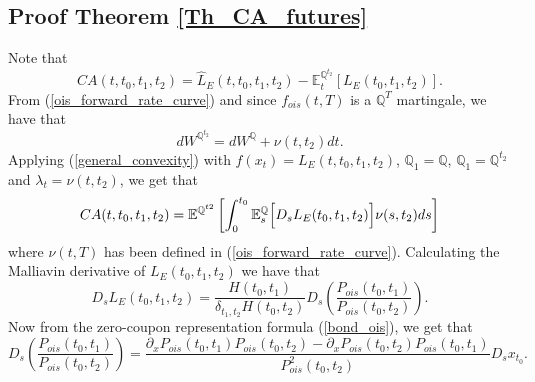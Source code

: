\documentclass[a4paper,10pt]{article}
\newcommand{\1}{\mathbf{1}}
\begin{document}
\subsection{Proof Theorem \ref{Th_CA_futures}}\label{Proof_CA_futures}
Note that
\begin{equation*}
CA(t, t_0, t_1, t_2) = \hat{L}_{E}(t,t_0, t_1, t_2) - \mathbb{E}_t^{\mathbb{Q}^{t_2}}\left[L_{E}(t_0, t_1, t_2) \right].
\end{equation*}
From (\ref{ois_forward_rate_curve}) and since $f_{ois}(t,T)$ is a $\mathbb{Q}^{T}$ martingale, we have that
\begin{equation}\label{girsanov_spot_forward}
dW^{\mathbb{Q}^{t_2}} = dW^{\mathbb{Q}} + \nu(t,t_2) dt. 
\end{equation}
Applying (\ref{general_convexity}) with $f(x_t)=L_{E}(t,t_0, t_1, t_2)$, $\mathbb{Q}_1=\mathbb{Q}$, $\mathbb{Q}_1=\mathbb{Q}^{t_2}$ and $\lambda_t = \nu(t,t_2)$,  we get that
\begin{equation}\label{ca_general_future}
CA(t, t_0, t_1, t_2) = \mathbb{E}^{\mathbb{Q}^{t2}}\left[\int_{0}^{t_0} \mathbb{E}^{\mathbb{Q}}_{s}\Bigl[D_s L_{E}(t_0,t_1,t_2) \Bigr] \nu(s,t_2) ds \right]
\end{equation}
where $\nu(t,T)$ has been defined in (\ref{ois_forward_rate_curve}). Calculating the Malliavin derivative of $L_{E}(t_0,t_1,t_2)$ we have that
\begin{equation*}
D_s L_{E}(t_0,t_1,t_2) = \frac{H(t_0,t_1)}{\delta_{t_1,t_2}H(t_0,t_2)} D_s \left(\frac{P_{ois}(t_0,t_1)}{P_{ois}(t_0,t_2)}\right).
\end{equation*}
Now from the zero-coupon representation formula (\ref{bond_ois}), we get that
\begin{equation*}
D_s \left(\frac{P_{ois}(t_0,t_1)}{P_{ois}(t_0,t_2)}\right) = \frac{\partial_{x}P_{ois}(t_0,t_1)P_{ois}(t_0,t_2) - \partial_{x}P_{ois}(t_0,t_2) P_{ois}(t_0,t_1)}{P^{2}_{ois}(t_0,t_2)} D_s x_{t_0}.
\end{equation*}
\end{document}
